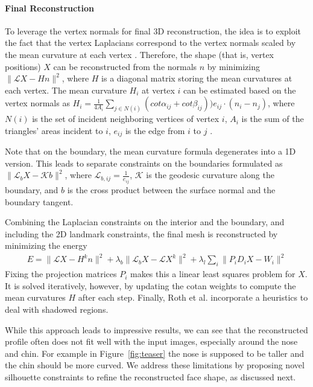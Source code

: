 \paragraph*{Final Reconstruction} To leverage the vertex normals for final 3D reconstruction, the idea is to exploit the fact that the vertex Laplacians correspond to the vertex normals scaled by the mean curvature at each vertex \cite{Meyer2003}. Therefore, the shape (that is, vertex positions) $X$ can be reconstructed from the normals $n$ by minimizing $ \|\mathcal{L}X-Hn\|^2$, where $H$ is a diagonal matrix storing the mean curvatures at each vertex. The mean curvature $H_i$ at vertex $i$ can be estimated based on the vertex normals as $H_{i}=\frac{1}{4A_{i}} \sum_{j\in N(i)}{(cot\alpha_{ij}+cot\beta_{ij}))e_{ij}\cdot(n_{i}-n_{j})}$, where $N(i)$ is the set of incident neighboring vertices of vertex $i$, $A_{i}$ is the sum of the triangles' areas incident to $i$, $e_{ij}$ is the edge from $i$ to $j$ \cite{Meyer2003}. 

Note that on the boundary, the mean curvature formula degenerates into a 1D version. This leads to separate constraints on the boundaries formulated as $\|\mathcal{L}_{b}X- \mathcal{K}b\|^2$, where $\mathcal{L}_{b,ij}=\frac{1}{e_{ij}}$, $\mathcal{K}$ is the geodesic curvature along the boundary, and $b$ is the cross product between the surface normal and the boundary tangent.

Combining the Laplacian constraints on the interior and the boundary, and including the 2D landmark constraints, the final mesh is reconstructed by minimizing the energy 
%
\begin{align}
\label{eq:reconstructionenergy}
E=\|\mathcal{L}X - H^{k}n\|^2+\lambda_{b}\|\mathcal{L}_{b}X - \mathcal{L}X^{k}\|^2+  \lambda_{l}\sum_{i}{\|P_{i}D_{i}X-W_{i}\|^2} 
\end{align} 
%
Fixing the projection matrices $P_i$ makes this a linear least squares problem for $X$. It is solved iteratively, however, by updating the cotan weights to compute the mean curvatures $H$ after each step. Finally, Roth et al. \cite{Roth:2015:UFR} incorporate a heuristics to deal with shadowed regions.

While this approach leads to impressive results, we can see that the reconstructed profile often does not fit well with the input images, especially around the nose and chin. For example in Figure~\ref{fig:teaser} the nose is supposed to be taller and the chin should be more curved. We address these limitations by proposing novel silhouette constraints to refine the reconstructed face shape, as discussed next.

